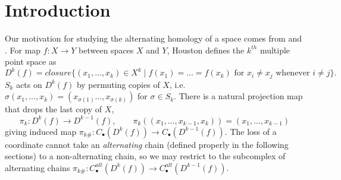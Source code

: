 \documentclass[11pt,a4paper,twoside]{article}
\theoremstyle{plain}
\theoremstyle{definition}
\theoremstyle{definition}
\theoremstyle{definition}
\theoremstyle{definition}
\theoremstyle{definition}
\begin{document}

\setcounter{page}{2}

\onehalfspacing
{}
\onehalfspacing




\section{Introduction}
Our motivation for studying the alternating homology of a space comes from \cite{Goryunov} and \cite{HoustonTopology}.
For map $f\!:\!X\longrightarrow Y$ between spaces $X$ and $Y$, Houston defines the $k^{th}$ multiple point space as
$$D^k(f)=closure\{(x_1,\dots,x_k)\in X^k\mid f(x_1)=\dots=f(x_k) \text{ for } x_i\neq x_j \text{ whenever } i\neq j\}.$$
$S_k$ acts on $D^k(f)$ by permuting copies of $X$, i.e. $\sigma(x_1,\dots,x_k)=(x_{\sigma(1)}\dots,x_{\sigma(k)})$ for $\sigma\in S_k$.
There is a natural projection map that drops the last copy of $X$, 
$$\pi_k\!:\!D^k(f)\longrightarrow D^{k\!-\!1}(f), \quad \quad \pi_k((x_1,\dots,x_{k\!-\!1},x_k))=(x_1,\dots,x_{k\!-\!1})$$ 
giving induced map $\pi_{k\#}\!:\!C_\bullet(D^k(f))\longrightarrow C_\bullet(D^{k\!-\!1}(f))$. The loss of a coordinate cannot take an \emph{alternating} chain (defined properly in the following sections) to a non-alternating chain, so we may restrict to the subcomplex of alternating chains $\pi_{k\#}\!:\!C^{alt}_\bullet(D^k(f))\longrightarrow C^{alt}_\bullet(D^{k\!-\!1}(f))$.
\end{document}
